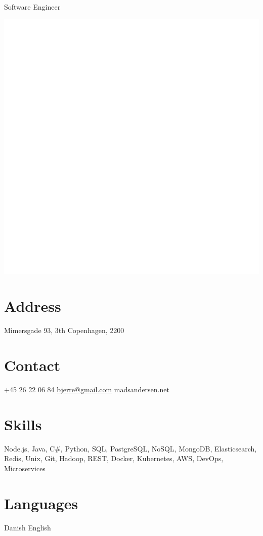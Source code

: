 \documentclass[]{friggeri-cv}
\begin{document}
      {Software Engineer}


\begin{aside}
  \includegraphics[scale=0.0382]{img/transparent.png}
  \section{Address}
    Mimersgade 93, 3th
    Copenhagen, 2200
    ~
  \section{Contact}
    +45 26 22 06 84
    \href{mailto:bjerre@gmail.com}{bjerre@gmail.com}
    madsandersen.net
    ~
  \section{Skills}
    Node.js, Java, C\#, Python, SQL, PostgreSQL, NoSQL, MongoDB, Elasticsearch, Redis, Unix, Git, Hadoop, REST, Docker, Kubernetes, AWS, DevOps, Microservices
    ~
  \section{Languages}
    Danish
    English
    ~
\end{aside}
~
\end{document}
